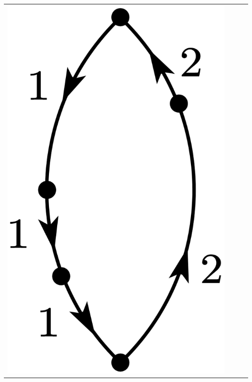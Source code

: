 \documentclass[a4paper]{book}
\newcounter{solution}[chapter]
\begin{document}
\begin{solution}
\begin{center}
\begin{tabular}{cccc}
		\begin{minipage}{0.22\linewidth}
		\centering
		\includegraphics[scale=1.0,trim=0 -4 0 -4]{./pictures/6.01/4.png}
		\captionof*{figure}{$\displaystyle (-1)^{3+1} \frac{ V^2_{11} V_{12} V_{21} V_{22} }{ ( E^{(0)}_1 - E^{(0)}_2)^4 }$}
		\end{minipage} \\
			

\end{tabular}
\end{center}
\end{solution}
\end{document}
